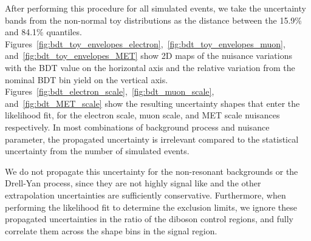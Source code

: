 After performing this procedure for all simulated events, we take the uncertainty bands from the non-normal toy distributions as the distance between the 15.9\% and 84.1\% quantiles.
Figures~\ref{fig:bdt_toy_envelopes_electron},~\ref{fig:bdt_toy_envelopes_muon}, and~\ref{fig:bdt_toy_envelopes_MET} show 2D maps of the nuisance variations with the BDT value on the horizontal axis and the relative variation from the nominal BDT bin yield on the vertical axis.
Figures~\ref{fig:bdt_electron_scale},~\ref{fig:bdt_muon_scale}, and~\ref{fig:bdt_MET_scale} show the resulting uncertainty shapes that enter the likelihood fit, for the electron scale, muon scale, and MET scale nuisances respectively. 
In most combinations of background process and nuisance parameter, the propagated uncertainty is irrelevant compared to the statistical uncertainty from the number of simulated events.

We do not propagate this uncertainty for the non-resonant backgrounds or the Drell-Yan process, since they are not highly signal like and the other extrapolation uncertainties are sufficiently conservative.
Furthermore, when performing the likelihood fit to determine the exclusion limits, we ignore these propagated uncertainties in the ratio of the diboson control regions, and fully correlate them across the shape bins in the signal region. 

